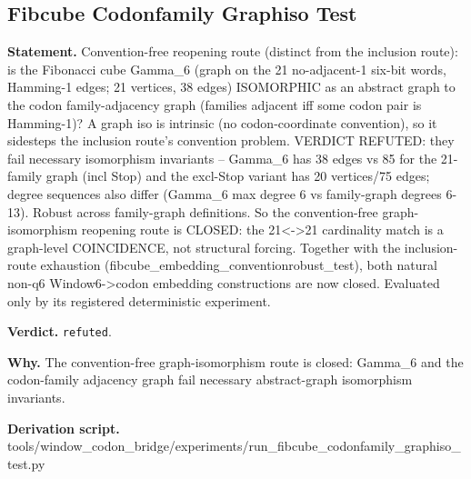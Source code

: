 \subsection{Fibcube Codonfamily Graphiso Test}\label{sec:bridge-fibcube-codonfamily-graphiso-test}
\textbf{Statement.} Convention-free reopening route (distinct from the inclusion route): is the Fibonacci cube Gamma\_6
(graph on the 21 no-adjacent-1 six-bit words, Hamming-1 edges; 21 vertices, 38 edges) ISOMORPHIC as
an abstract graph to the codon family-adjacency graph (families adjacent iff some codon pair is
Hamming-1)? A graph iso is intrinsic (no codon-coordinate convention), so it sidesteps the inclusion
route's convention problem. VERDICT REFUTED: they fail necessary isomorphism invariants -- Gamma\_6
has 38 edges vs 85 for the 21-family graph (incl Stop) and the excl-Stop variant has 20 vertices/75
edges; degree sequences also differ (Gamma\_6 max degree 6 vs family-graph degrees 6-13). Robust
across family-graph definitions. So the convention-free graph-isomorphism reopening route is CLOSED:
the 21<->21 cardinality match is a graph-level COINCIDENCE, not structural forcing. Together with
the inclusion-route exhaustion (fibcube\_embedding\_conventionrobust\_test), both natural non-q6
Window6->codon embedding constructions are now closed. Evaluated only by its registered
deterministic experiment.

\textbf{Verdict.} \texttt{refuted}.

\textbf{Why.} The convention-free graph-isomorphism route is closed: Gamma\_6 and the codon-family adjacency graph
fail necessary abstract-graph isomorphism invariants.

\textbf{Derivation script.} tools/window\_codon\_bridge/experiments/run\_fibcube\_codonfamily\_graphiso\_test.py

